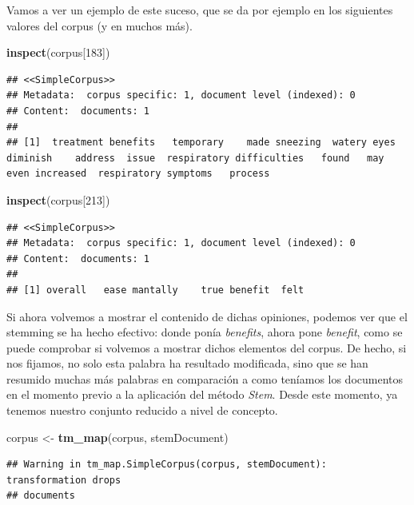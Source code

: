 \documentclass[spanish,]{article}
\newenvironment{Shaded}{\begin{snugshade}}{\end{snugshade}}
\newcommand{\KeywordTok}[1]{\textcolor[rgb]{0.13,0.29,0.53}{\textbf{#1}}}
\newcommand{\DecValTok}[1]{\textcolor[rgb]{0.00,0.00,0.81}{#1}}
\newcommand{\StringTok}[1]{\textcolor[rgb]{0.31,0.60,0.02}{#1}}
\newcommand{\NormalTok}[1]{#1}
\begin{document}
Vamos a ver un ejemplo de este suceso, que se da por ejemplo en los
siguientes valores del corpus (y en muchos más).

\begin{Shaded}
\begin{Highlighting}[]
\KeywordTok{inspect}\NormalTok{(corpus[}\DecValTok{183}\NormalTok{])}
\end{Highlighting}
\end{Shaded}

\begin{verbatim}
## <<SimpleCorpus>>
## Metadata:  corpus specific: 1, document level (indexed): 0
## Content:  documents: 1
## 
## [1]  treatment benefits   temporary    made sneezing  watery eyes diminish    address  issue  respiratory difficulties   found   may  even increased  respiratory symptoms   process
\end{verbatim}

\begin{Shaded}
\begin{Highlighting}[]
\KeywordTok{inspect}\NormalTok{(corpus[}\DecValTok{213}\NormalTok{])}
\end{Highlighting}
\end{Shaded}

\begin{verbatim}
## <<SimpleCorpus>>
## Metadata:  corpus specific: 1, document level (indexed): 0
## Content:  documents: 1
## 
## [1] overall   ease mantally    true benefit  felt
\end{verbatim}

Si ahora volvemos a mostrar el contenido de dichas opiniones, podemos
ver que el stemming se ha hecho efectivo: donde ponía \textit{benefits},
ahora pone \textit{benefit}, como se puede comprobar si volvemos a
mostrar dichos elementos del corpus. De hecho, si nos fijamos, no solo
esta palabra ha resultado modificada, sino que se han resumido muchas
más palabras en comparación a como teníamos los documentos en el momento
previo a la aplicación del método \textit{Stem}. Desde este momento, ya
tenemos nuestro conjunto reducido a nivel de concepto.

\begin{Shaded}
\begin{Highlighting}[]
\NormalTok{corpus <-}\StringTok{ }\KeywordTok{tm_map}\NormalTok{(corpus, stemDocument)}
\end{Highlighting}
\end{Shaded}

\begin{verbatim}
## Warning in tm_map.SimpleCorpus(corpus, stemDocument): transformation drops
## documents
\end{verbatim}
\end{document}
